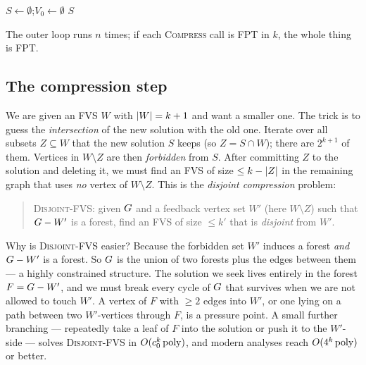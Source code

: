 \begin{algorithm}[H]
\caption{\textsc{IterativeFVS}$(\Gph,k)$ --- build-and-compress}
\label{ch25:alg-itercomp}
\DontPrintSemicolon
{}
$S \gets \emptyset$;\quad $V_0\gets\emptyset$\;
\Return $S$\;
\end{algorithm}

The outer loop runs $n$ times; if each \textsc{Compress} call is FPT in $k$, the whole thing is FPT.

\subsection{The compression step}

We are given an FVS $W$ with $\lvert W\rvert=k+1$ and want a smaller one. The trick is to guess the \emph{intersection} of the new solution with the old one. Iterate over all subsets $Z\subseteq W$ that the new solution $S$ keeps (so $Z = S\cap W$); there are $2^{k+1}$ of them. Vertices in $W\setminus Z$ are then \emph{forbidden} from $S$. After committing $Z$ to the solution and deleting it, we must find an FVS of size $\le k-\lvert Z\rvert$ in the remaining graph that uses \emph{no} vertex of $W\setminus Z$. This is the \emph{disjoint compression} problem:

\begin{quote}
\textsc{Disjoint-FVS}: given $G$ and a feedback vertex set $W'$ (here $W\setminus Z$) such that $G - W'$ is a forest, find an FVS of size $\le k'$ that is \emph{disjoint} from $W'$.
\end{quote}

\begin{whybox}
Why is \textsc{Disjoint-FVS} easier? Because the forbidden set $W'$ induces a forest \emph{and} $G - W'$ is a forest. So $G$ is the union of two forests plus the edges between them --- a highly constrained structure. The solution we seek lives entirely in the forest $F=G-W'$, and we must break every cycle of $G$ that survives when we are not allowed to touch $W'$. A vertex of $F$ with $\ge 2$ edges into $W'$, or one lying on a path between two $W'$-vertices through $F$, is a pressure point. A small further branching --- repeatedly take a leaf of $F$ into the solution or push it to the $W'$-side --- solves \textsc{Disjoint-FVS} in $O(c_0^{k}\operatorname{poly})$, and modern analyses reach $O(4^{k}\operatorname{poly})$ or better.
\end{whybox}

